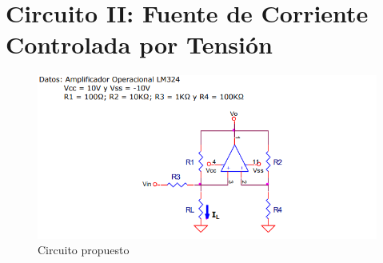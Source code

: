 \documentclass[11pt, a4paper]{article}
\begin{document}
\section{Circuito II: Fuente de Corriente Controlada por Tensión}
\begin{figure}[htb]
	\centering
	\includegraphics[width=1\textwidth]{Imagenes/Circ2.png}
	\caption{Circuito propuesto}
\end{figure}
\end{document}
